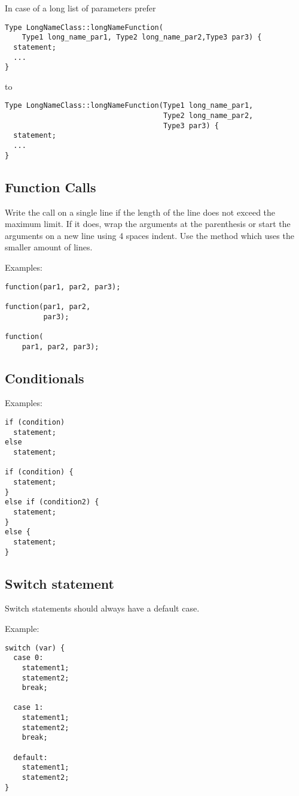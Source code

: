 \vspace{3em}

In case of a long list of parameters prefer
\begin{lstlisting}
Type LongNameClass::longNameFunction(
    Type1 long_name_par1, Type2 long_name_par2,Type3 par3) {
  statement;
  ...
}
\end{lstlisting}
to
\begin{lstlisting}
Type LongNameClass::longNameFunction(Type1 long_name_par1,
                                     Type2 long_name_par2,
                                     Type3 par3) {
  statement;
  ...
}
\end{lstlisting}

\subsection{Function Calls}

Write the call on a single line if the length of the line does not exceed the maximum limit.
If it does, wrap the arguments at the parenthesis or start the arguments on a new line using 4 spaces indent.
Use the method which uses the smaller amount of lines.

Examples:
\begin{lstlisting}
function(par1, par2, par3);

function(par1, par2,
         par3);

function(
    par1, par2, par3);
\end{lstlisting}

\subsection{Conditionals}

Examples:
\begin{lstlisting}
if (condition)
  statement;
else
  statement;

if (condition) {
  statement;
}
else if (condition2) {
  statement;
}
else {
  statement;
}
\end{lstlisting}

\subsection{Switch statement}

Switch statements should always have a default case.

Example:
\begin{lstlisting}
switch (var) {
  case 0:
    statement1;
    statement2;
    break;

  case 1:
    statement1;
    statement2;
    break;

  default:
    statement1;
    statement2;
}
\end{lstlisting}

